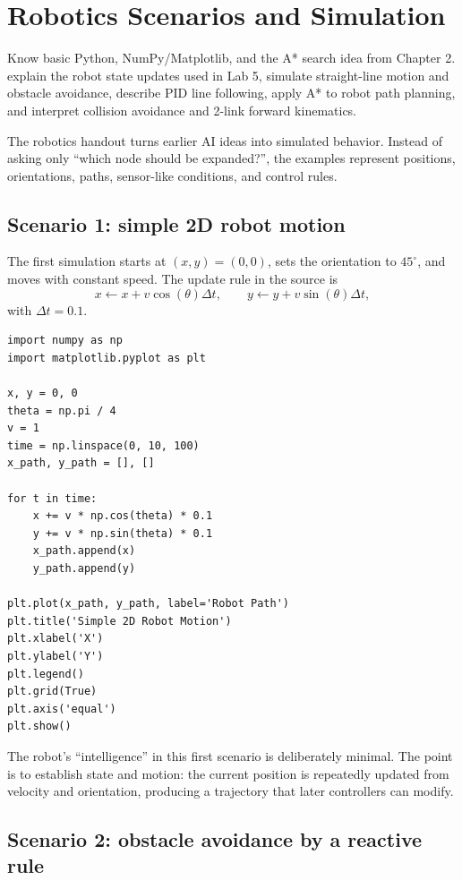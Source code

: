 \chapter{Robotics Scenarios and Simulation}
\label{ch:robotics}

\chapterguide%
  {Know basic Python, NumPy/Matplotlib, and the A* search idea from Chapter 2.}
  {explain the robot state updates used in Lab 5, simulate straight-line motion and obstacle avoidance, describe PID line following, apply A* to robot path planning, and interpret collision avoidance and 2-link forward kinematics.}

The robotics handout turns earlier AI ideas into simulated behavior. Instead of asking only ``which node should be expanded?'', the examples represent positions, orientations, paths, sensor-like conditions, and control rules.

\section{Scenario 1: simple 2D robot motion}

The first simulation starts at \((x,y)=(0,0)\), sets the orientation to \(45^\circ\), and moves with constant speed. The update rule in the source is
\[
x\leftarrow x+v\cos(\theta)\Delta t,
\qquad
 y\leftarrow y+v\sin(\theta)\Delta t,
\]
with \(\Delta t=0.1\).

\begin{lstlisting}[style=mlpython]
import numpy as np
import matplotlib.pyplot as plt

x, y = 0, 0
theta = np.pi / 4
v = 1
time = np.linspace(0, 10, 100)
x_path, y_path = [], []

for t in time:
    x += v * np.cos(theta) * 0.1
    y += v * np.sin(theta) * 0.1
    x_path.append(x)
    y_path.append(y)

plt.plot(x_path, y_path, label='Robot Path')
plt.title('Simple 2D Robot Motion')
plt.xlabel('X')
plt.ylabel('Y')
plt.legend()
plt.grid(True)
plt.axis('equal')
plt.show()
\end{lstlisting}

\begin{intuition}
The robot's ``intelligence'' in this first scenario is deliberately minimal. The point is to establish state and motion: the current position is repeatedly updated from velocity and orientation, producing a trajectory that later controllers can modify.
\end{intuition}

\section{Scenario 2: obstacle avoidance by a reactive rule}

